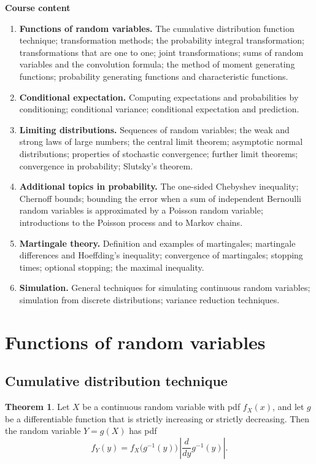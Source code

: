 \documentclass[11pt,a4paper]{article}
\theoremstyle{definition}
\newtheorem{thm}{Theorem}[subsection]
\newcommand{\subhead}[1]{%
  \par\medskip\noindent\textbf{#1}\par\nobreak\smallskip}
\begin{document}
\subhead{Course content}
\begin{enumerate}
\item \textbf{Functions of random variables.} The cumulative distribution function technique; transformation
methods; the probability integral transformation; transformations that are one to one; joint
transformations; sums of random variables and the convolution formula; the method of moment generating
functions; probability generating functions and characteristic functions.
\item \textbf{Conditional expectation.} Computing expectations and probabilities by conditioning; conditional
variance; conditional expectation and prediction.
\item \textbf{Limiting distributions.} Sequences of random variables; the weak and strong laws of large
numbers; the central limit theorem; asymptotic normal distributions; properties of stochastic convergence; further limit theorems; convergence in probability; Slutsky's theorem.
\item \textbf{Additional topics in probability.} The one-sided Chebyshev inequality; Chernoff bounds; bounding
the error when a sum of independent Bernoulli random variables is approximated by a Poisson random variable;
introductions to the Poisson process and to Markov chains.
\item \textbf{Martingale theory.} Definition and examples of martingales; martingale differences and
Hoeffding's inequality; convergence of martingales; stopping times; optional stopping; the maximal
inequality.
\item \textbf{Simulation.} General techniques for simulating continuous random variables; simulation from
discrete distributions; variance reduction techniques.
\end{enumerate}

\section{Functions of random variables}

\subsection{Cumulative distribution technique}
\begin{thm}\label{thm:transform}
Let $X$ be a continuous random variable with pdf $f_X(x)$, and let $g$ be a differentiable function that is strictly
increasing or strictly decreasing. Then the random variable $Y = g(X)$ has pdf
\[
f_Y(y) = f_X\bigl(g^{-1}(y)\bigr)\,\left|\frac{d}{dy}g^{-1}(y)\right| .
\]
\end{thm}
\end{document}
